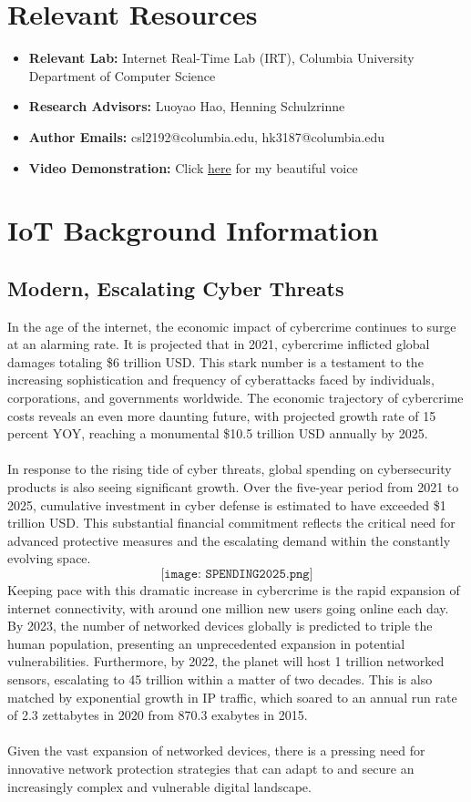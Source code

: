 

\section{Relevant Resources}
\begin{itemize}
    \item \textbf{Relevant Lab:} Internet Real-Time Lab (IRT), Columbia University Department of Computer Science
    \item \textbf{Research Advisors:} Luoyao Hao, Henning Schulzrinne
    \item \textbf{Author Emails:} csl2192@columbia.edu, hk3187@columbia.edu
    \item \textbf{Video Demonstration:} Click \href{https://youtu.be/laNO6OkpahU}{here} for my beautiful voice
\end{itemize}


\pagebreak
\section{IoT Background Information}
\subsection{Modern, Escalating Cyber Threats}
In the age of the internet, the economic impact of cybercrime continues to surge at an alarming rate. It is projected that in 2021, cybercrime inflicted global damages totaling \$6 trillion USD. This stark number is a testament to the increasing sophistication and frequency of cyberattacks faced by individuals, corporations, and governments worldwide. The economic trajectory of cybercrime costs reveals an even more daunting future, with projected growth rate of 15 percent YOY, reaching a monumental \$10.5 trillion USD annually by 2025. \\
\\
In response to the rising tide of cyber threats, global spending on cybersecurity products is also seeing significant growth. Over the five-year period from 2021 to 2025, cumulative investment in cyber defense is estimated to have exceeded \$1 trillion USD. This substantial financial commitment reflects the critical need for advanced protective measures and the escalating demand within the constantly evolving space.
$$
\texttt{[image: SPENDING2025.png]}
$$
Keeping pace with this dramatic increase in cybercrime is the rapid expansion of internet connectivity, with around one million new users going online each day. By 2023, the number of networked devices globally is predicted to triple the human population, presenting an unprecedented expansion in potential vulnerabilities. Furthermore, by 2022, the planet will host 1 trillion networked sensors, escalating to 45 trillion within a matter of two decades. This is also matched by exponential growth in IP traffic, which soared to an annual run rate of 2.3 zettabytes in 2020 from 870.3 exabytes in 2015. \\
\\
Given the vast expansion of networked devices, there is a pressing need for innovative network protection strategies that can adapt to and secure an increasingly complex and vulnerable digital landscape. 
